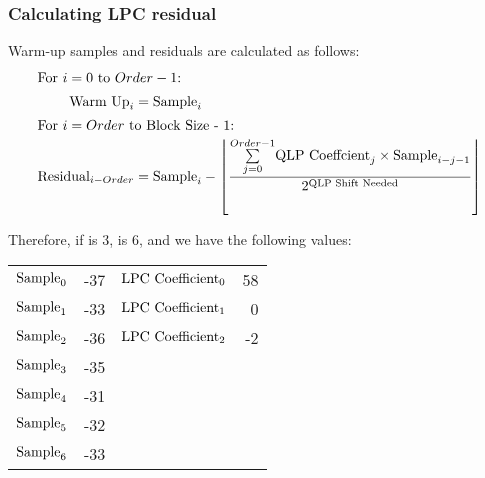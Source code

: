 
\subsubsection{Calculating LPC residual}

Warm-up samples and residuals are calculated as follows:
\begin{align*}
\intertext{For $i = 0$ to $Order - 1$:}
\text{Warm Up}_i &= \text{Sample}_i \\
\intertext{For $i = Order$ to Block Size - 1:}
\text{Residual}_{i - Order} &= \text{Sample}_i -
\left \lfloor \frac{\overset{Order - 1}{\underset{j = 0}{\sum}}
  \text{QLP Coeffcient}_j \times \text{Sample}_{i - j - 1} }{
2 ^ \text{QLP Shift Needed}} \right \rfloor
\end{align*}
\par
\noindent
Therefore, if  is 3,  is 6,
and we have the following values:
\begin{tabular}{r r | r r}
$\text{Sample}_0$ & -37 & $\text{LPC Coefficient}_0$ & 58 \\
$\text{Sample}_1$ & -33 & $\text{LPC Coefficient}_1$ & 0 \\
$\text{Sample}_2$ & -36 & $\text{LPC Coefficient}_2$ & -2 \\
$\text{Sample}_3$ & -35 & & \\
$\text{Sample}_4$ & -31 & & \\
$\text{Sample}_5$ & -32 & & \\
$\text{Sample}_6$ & -33 & & \\
\end{tabular}

\clearpage

